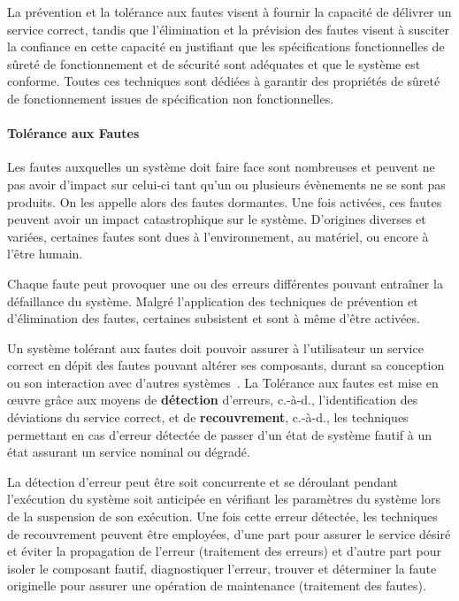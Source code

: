 \documentclass[french, a4paper, 11pt, twoside, pdftex]{StyleThese}
\begin{document}
		La prévention et la tolérance aux fautes visent à fournir la capacité de délivrer un service correct, tandis que l’élimination et la prévision des fautes visent à susciter la confiance en cette capacité en justifiant que les spécifications fonctionnelles de sûreté de fonctionnement et de sécurité sont adéquates et que le système est conforme. Toutes ces techniques sont dédiées à garantir des propriétés de sûreté de fonctionnement issues de spécification non fonctionnelles. %
		
		\paragraph{Tolérance aux Fautes}
		Les fautes auxquelles un système doit faire face sont nombreuses et peuvent ne pas avoir d’impact sur celui-ci tant qu’un ou plusieurs évènements ne se sont pas produits. On les appelle alors des fautes dormantes. Une fois activées, ces fautes peuvent avoir un impact catastrophique sur le système. D’origines diverses et variées, certaines fautes sont dues à l’environnement, au matériel, ou encore à l’être humain.
		
		Chaque faute peut provoquer une ou des erreurs différentes pouvant entraîner la défaillance du système. Malgré l’application des techniques de prévention et d’élimination des fautes, certaines subsistent et sont à même d’être activées.
		
		Un système tolérant aux fautes doit pouvoir assurer à l’utilisateur un service correct en dépit des fautes pouvant altérer ses composants, durant sa conception ou son interaction avec d’autres systèmes~\cite{avizienis_basic_2004}. La Tolérance aux fautes est mise en œuvre grâce aux moyens de \textbf{détection} d’erreurs, c.-à-d., l’identification des déviations du service correct, et de \textbf{recouvrement}, c.-à-d., les techniques permettant en cas d’erreur détectée de passer d’un état de système fautif à un état assurant un service nominal ou dégradé.
		
		La détection d’erreur peut être soit concurrente et se déroulant pendant l’exécution du système soit anticipée en vérifiant les paramètres du système lors de la suspension de son exécution. Une fois cette erreur détectée, les techniques de recouvrement peuvent être employées, d’une part pour assurer le service désiré et éviter la propagation de l’erreur (traitement des erreurs) et d’autre part pour isoler le composant fautif, diagnostiquer l’erreur, trouver et déterminer la faute originelle pour assurer une opération de maintenance (traitement des fautes).
		
\end{document}
